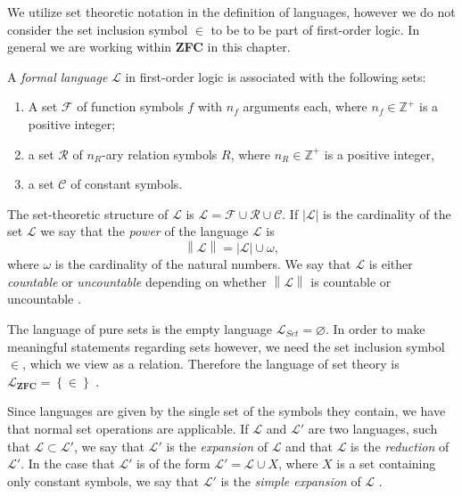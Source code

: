\documentclass[../../main.tex]{subfiles}
\begin{document}
We utilize set theoretic notation in the definition of languages, however we do not consider the set inclusion symbol $\in$ to be to be part of first-order logic.
In general we are working within \textbf{ZFC} in this chapter.

\begin{definition}\label{language-def}\cite[Definition 1.1.1]{Mar02}
    A \textit{formal language} $\mathcal{L}$ in first-order logic is associated with the following sets:
    \begin{enumerate}
        \item A set $\mathcal{F}$ of function symbols $f$ with $n_f$ arguments each, 
        where $n_f \in \mathbb{Z}^+$ is a positive integer;
        \item a set $\mathcal{R}$ of $n_R$-ary relation symbols $R$, 
        where $n_R \in \mathbb{Z}^+$ is a positive integer,
        \item a set $\mathcal{C}$ of constant symbols.
    \end{enumerate}
    The set-theoretic structure of $\mathcal{L}$ is $\mathcal{L} = \mathcal{F} \cup \mathcal{R} \cup \mathcal{C}$.
    If $\left\lvert \mathcal{L}\right\rvert$ is the cardinality of the set $\mathcal{L}$ we say that the \emph{power} of the language $\mathcal{L}$ is
    $$\left\lVert \mathcal{L}\right\rVert = \left\lvert\mathcal{L}\right\rvert \cup \omega,$$
    where $\omega$ is the cardinality of the natural numbers.
    We say that $\mathcal{L}$ is either \emph{countable} or \emph{uncountable} depending on whether $\left\lVert\mathcal{L}\right\rVert$ is countable or uncountable \cite[\S1.3]{Cha90}.
\end{definition}

The language of pure sets is the empty language $\mathcal{L}_{Set} = \varnothing$.
In order to make meaningful statements regarding sets however, we need the set inclusion symbol $\in$, which we view as a relation.
Therefore the language of set theory is $\mathcal{L}_{\textbf{ZFC}} = \left\{\in\right\}$ \cite[p.8]{Mar02}\cite[p.80]{Jec78}.

Since languages are given by the single set of the symbols they contain, we have that normal set operations are applicable.
If $\mathcal{L}$ and $\mathcal{L}'$ are two languages, such that $\mathcal{L} \subset \mathcal{L}'$, 
we say that $\mathcal{L}'$ is the \textit{expansion} of $\mathcal{L}$ and that $\mathcal{L}$ is the \textit{reduction} of $\mathcal{L}'$.
In the case that $\mathcal{L}'$ is of the form $\mathcal{L}'= \mathcal{L} \cup X$, where $X$ is a set containing only constant symbols, 
we say that $\mathcal{L}'$ is the \textit{simple expansion} of $\mathcal{L}$ \cite[p.19]{Cha90}.
\end{document}

